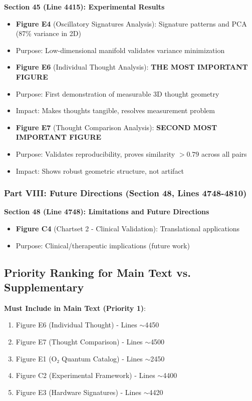 \documentclass[11pt]{article}
\begin{document}
\textbf{Section 45 (Line 4415): Experimental Results}
\begin{itemize}
\item \textbf{Figure E4} (Oscillatory Signatures Analysis): Signature patterns and PCA (87\% variance in 2D)
\item Purpose: Low-dimensional manifold validates variance minimization
\item \textbf{Figure E6} (Individual Thought Analysis): \textbf{THE MOST IMPORTANT FIGURE}
\item Purpose: First demonstration of measurable 3D thought geometry
\item Impact: Makes thoughts tangible, resolves measurement problem
\item \textbf{Figure E7} (Thought Comparison Analysis): \textbf{SECOND MOST IMPORTANT FIGURE}
\item Purpose: Validates reproducibility, proves similarity $> 0.79$ across all pairs
\item Impact: Shows robust geometric structure, not artifact
\end{itemize}

\subsubsection{Part VIII: Future Directions (Section 48, Lines 4748-4810)}

\textbf{Section 48 (Line 4748): Limitations and Future Directions}
\begin{itemize}
\item \textbf{Figure C4} (Chartset 2 - Clinical Validation): Translational applications
\item Purpose: Clinical/therapeutic implications (future work)
\end{itemize}

\subsection{Priority Ranking for Main Text vs. Supplementary}

\textbf{Must Include in Main Text (Priority 1)}:
\begin{enumerate}
\item Figure E6 (Individual Thought) - Lines $\sim$4450
\item Figure E7 (Thought Comparison) - Lines $\sim$4500
\item Figure E1 (O₂ Quantum Catalog) - Lines $\sim$2450
\item Figure C2 (Experimental Framework) - Lines $\sim$4400
\item Figure E3 (Hardware Signatures) - Lines $\sim$4420
\end{enumerate}
\end{document}
